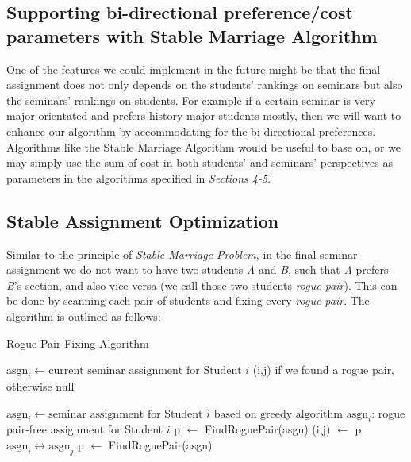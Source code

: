 \documentclass{article} %
\begin{document}
\subsection{Supporting bi-directional preference/cost parameters with Stable Marriage Algorithm}
   \par\qquad One of the features we could implement in the future might be that the final assignment does not only depends on the students' rankings on seminars but also the seminars' rankings on students. For example if a certain seminar is very major-orientated and prefers history major students mostly, then we will want to enhance our algorithm by accommodating for the bi-directional preferences. Algorithms like the Stable Marriage Algorithm would be useful to base on, or we may simply use the sum of cost in both students' and seminars' perspectives as parameters in the algorithms specified in \emph{Sections 4-5}.
   
\subsection{Stable Assignment Optimization}
    \par\qquad Similar to the principle of \emph{Stable Marriage Problem}, in the final seminar assignment we do not want to have two students \emph{A} and \emph{B}, such that \emph{A} prefers \emph{B}'s section, and also vice versa (we call those two students \emph{rogue pair}). This can be done by scanning each pair of students and fixing every \emph{rogue pair}. The algorithm is outlined as follows:
    \begin{algorithm}
        \caption{Rogue-Pair Fixing Algorithm}
        \begin{algorithmic}
        \Require $\text{asgn}_i \gets \text{current seminar assignment for Student $i$}$
        \Ensure (i,j) if we found a rogue pair, otherwise null
                    \EndIf
                \EndFor
            \EndFor
        \EndFunction
        
        \null
        
        \Require $\text{asgn}_i \gets \text{seminar assignment for Student $i$ based on greedy algorithm}$
        \Ensure $\text{asgn}_i$: rogue pair-free assignment for Student $i$
                \State p $\gets$ FindRoguePair(asgn)
                    \State (i,j) $\gets$ p
                    \State $\text{asgn}_i \leftrightarrow \text{asgn}_j$
                    \State p $\gets$ FindRoguePair(asgn)
                \EndWhile
        
        \end{algorithmic}
    \end{algorithm}
    
\end{document}
